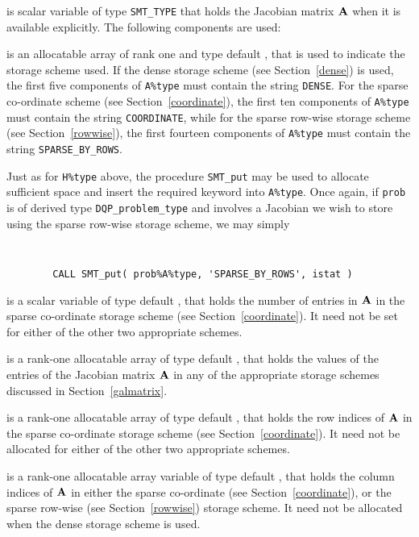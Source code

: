 \documentclass{galahad}
\newcommand{\packagename}{DQP}
\begin{document}
\begin{description}
 is scalar variable of type {\tt SMT\_TYPE}
that holds the Jacobian matrix ${\mathbf{A}}$ when it is available explicitly.
The following components are used:

\begin{description}

 is an allocatable array of rank one and type default \character,
that is used to indicate the storage scheme used. If the dense storage scheme
(see Section~\ref{dense}) is used,
the first five components of {\tt A\%type} must contain the
string {\tt DENSE}.
For the sparse co-ordinate scheme (see Section~\ref{coordinate}),
the first ten components of {\tt A\%type} must contain the
string {\tt COORDINATE}, while
for the sparse row-wise storage scheme (see Section~\ref{rowwise}),
the first fourteen components of {\tt A\%type} must contain the
string {\tt SPARSE\_BY\_ROWS}.

Just as for {\tt H\%type} above, the procedure {\tt SMT\_put}
may be used to allocate sufficient space and insert the required keyword
into {\tt A\%type}.
Once again, if {\tt prob} is of derived type {\tt \packagename\_problem\_type}
and involves a Jacobian we wish to store using the sparse row-wise
storage scheme, we may simply
{\tt
\begin{verbatim}
        CALL SMT_put( prob%A%type, 'SPARSE_BY_ROWS', istat )
\end{verbatim}
}
\noindent

 is a scalar variable of type default \integer, that
holds the number of entries in ${\mathbf{A}}$
in the sparse co-ordinate storage scheme (see Section~\ref{coordinate}).
It need not be set for either of the other two appropriate schemes.

 is a rank-one allocatable array of type default \realdp, that holds
the values of the entries of the Jacobian matrix ${\mathbf{A}}$ in any of the
appropriate storage schemes discussed in Section~\ref{galmatrix}.

 is a rank-one allocatable array of type default \integer,
that holds the row indices of ${\mathbf{A}}$ in the sparse co-ordinate storage
scheme (see Section~\ref{coordinate}).
It need not be allocated for either of the other two appropriate schemes.

 is a rank-one allocatable array variable of type default \integer,
that holds the column indices of ${\mathbf{A}}$ in either the sparse co-ordinate
(see Section~\ref{coordinate}), or the sparse row-wise
(see Section~\ref{rowwise}) storage scheme.
It need not be allocated when the dense storage scheme is used.


\end{description}
\end{description}
\end{document}
